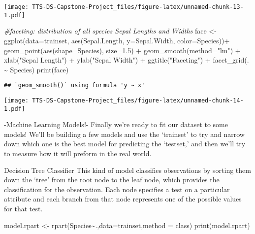 \documentclass[
]{article}
\newenvironment{Shaded}{\begin{snugshade}}{\end{snugshade}}
\newcommand{\AttributeTok}[1]{\textcolor[rgb]{0.77,0.63,0.00}{#1}}
\newcommand{\CommentTok}[1]{\textcolor[rgb]{0.56,0.35,0.01}{\textit{#1}}}
\newcommand{\FloatTok}[1]{\textcolor[rgb]{0.00,0.00,0.81}{#1}}
\newcommand{\FunctionTok}[1]{\textcolor[rgb]{0.00,0.00,0.00}{#1}}
\newcommand{\NormalTok}[1]{#1}
\newcommand{\OtherTok}[1]{\textcolor[rgb]{0.56,0.35,0.01}{#1}}
\newcommand{\SpecialCharTok}[1]{\textcolor[rgb]{0.00,0.00,0.00}{#1}}
\newcommand{\StringTok}[1]{\textcolor[rgb]{0.31,0.60,0.02}{#1}}
\begin{document}
\texttt{[image: TTS-DS-Capstone-Project\_files/figure-latex/unnamed-chunk-13-1.pdf]}

\begin{Shaded}
\begin{Highlighting}[]
\CommentTok{\#faceting: distribution of all species\textquotesingle{} Sepal Lengths and Widths}
\NormalTok{face }\OtherTok{\textless{}{-}} \FunctionTok{ggplot}\NormalTok{(}\AttributeTok{data=}\NormalTok{trainset, }\FunctionTok{aes}\NormalTok{(Sepal.Length, }\AttributeTok{y=}\NormalTok{Sepal.Width, }\AttributeTok{color=}\NormalTok{Species))}\SpecialCharTok{+}
    \FunctionTok{geom\_point}\NormalTok{(}\FunctionTok{aes}\NormalTok{(}\AttributeTok{shape=}\NormalTok{Species), }\AttributeTok{size=}\FloatTok{1.5}\NormalTok{) }\SpecialCharTok{+} 
    \FunctionTok{geom\_smooth}\NormalTok{(}\AttributeTok{method=}\StringTok{"lm"}\NormalTok{) }\SpecialCharTok{+}
    \FunctionTok{xlab}\NormalTok{(}\StringTok{"Sepal Length"}\NormalTok{) }\SpecialCharTok{+}
    \FunctionTok{ylab}\NormalTok{(}\StringTok{"Sepal Width"}\NormalTok{) }\SpecialCharTok{+}
    \FunctionTok{ggtitle}\NormalTok{(}\StringTok{"Faceting"}\NormalTok{) }\SpecialCharTok{+}
    \FunctionTok{facet\_grid}\NormalTok{(. }\SpecialCharTok{\textasciitilde{}}\NormalTok{ Species)}
\FunctionTok{print}\NormalTok{(face)}
\end{Highlighting}
\end{Shaded}

\begin{verbatim}
## `geom_smooth()` using formula 'y ~ x'
\end{verbatim}

\texttt{[image: TTS-DS-Capstone-Project\_files/figure-latex/unnamed-chunk-14-1.pdf]}

-Machine Learning Models!- Finally we're ready to fit our dataset to
some models! We'll be building a few models and use the `trainset' to
try and narrow down which one is the best model for predicting the
`testset,' and then we'll try to measure how it will preform in the real
world.

Decision Tree Classifier This kind of model classifies observations by
sorting them down the `tree' from the root node to the leaf node, which
provides the classification for the observation. Each node specifies a
test on a particular attribute and each branch from that node represents
one of the possible values for that test.

\begin{Shaded}
\begin{Highlighting}[]
\NormalTok{model.rpart }\OtherTok{\textless{}{-}} \FunctionTok{rpart}\NormalTok{(Species}\SpecialCharTok{\textasciitilde{}}\NormalTok{.,}\AttributeTok{data=}\NormalTok{trainset,}\AttributeTok{method =} \StringTok{\textquotesingle{}class\textquotesingle{}}\NormalTok{)}
\FunctionTok{print}\NormalTok{(model.rpart)}
\end{Highlighting}
\end{Shaded}
\end{document}
